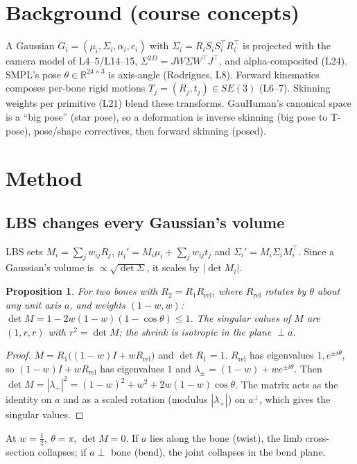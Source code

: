 \documentclass[10pt,twocolumn]{article}
\newtheorem{proposition}{Proposition}
\begin{document}
\section{Background (course concepts)}
A Gaussian $G_i=(\mu_i,\Sigma_i,\alpha_i,c_i)$ with $\Sigma_i=R_iS_iS_i^\top R_i^\top$ is projected with the camera
model of L4--5/L14--15, $\Sigma^{2D}=JW\Sigma W^\top J^\top$, and alpha-composited (L24). SMPL's pose $\theta\in\mathbb{R}^{24\times3}$
is axis-angle (Rodrigues, L8). Forward kinematics composes per-bone rigid motions $T_j=(R_j,t_j)\in SE(3)$ (L6--7).
Skinning weights per primitive (L21) blend these transforms. GauHuman's canonical space is a ``big pose'' (star pose),
so a deformation is inverse skinning (big pose to T-pose), pose/shape correctives, then forward skinning (posed).

\section{Method}
\subsection{LBS changes every Gaussian's volume}
LBS sets $M_i=\sum_j w_{ij}R_j$, $\mu_i'=M_i\mu_i+\sum_j w_{ij}t_j$ and $\Sigma_i'=M_i\Sigma_iM_i^\top$. Since a Gaussian's
volume is $\propto\sqrt{\det\Sigma}$, it scales by $|\det M_i|$.
\begin{proposition}\label{prop:lbs}
For two bones with $R_2=R_1R_\mathrm{rel}$, where $R_\mathrm{rel}$ rotates by $\theta$ about any unit axis $a$, and weights $(1-w,w)$:
$\det M = 1-2w(1-w)(1-\cos\theta)\le1$. The singular values of $M$ are $(1,r,r)$ with $r^2=\det M$; the shrink is
isotropic in the plane $\perp a$.
\end{proposition}
\begin{proof}
$M=R_1\big((1-w)I+wR_\mathrm{rel}\big)$ and $\det R_1=1$. $R_\mathrm{rel}$ has eigenvalues $1,e^{\pm i\theta}$, so
$(1-w)I+wR_\mathrm{rel}$ has eigenvalues $1$ and $\lambda_\pm=(1-w)+we^{\pm i\theta}$. Then
$\det M=|\lambda_+|^2=(1-w)^2+w^2+2w(1-w)\cos\theta$. The matrix acts as the identity on $a$ and as a scaled rotation
(modulus $|\lambda_+|$) on $a^\perp$, which gives the singular values.
\end{proof}
At $w=\tfrac12,\ \theta=\pi$, $\det M=0$. If $a$ lies along the bone (twist), the limb cross-section collapses; if
$a\perp$ bone (bend), the joint collapses in the bend plane.
\end{document}
